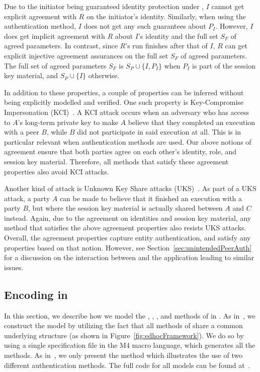 Due to the initiator being guaranteed identity protection under \mEdhoc{}, $I$
cannot get explicit agreement with $R$ on the initiator's identity.
%
Similarly, when using the \mStat{} authentication method, $I$ does not get 
any
such guarantees about $P_{I}$.
%
However, $I$ does get implicit agreement with $R$ about $I$'s identity and the
full set $S_{F}$ of agreed parameters.
%
In contrast, since $R$'s run finishes after that of $I$, $R$ can get explicit
injective agreement assurances on the full set $S_{F}$ of agreed parameters.
%
The full set of agreed parameters $S_F$ is $S_P \cup \{I, P_I\}$ when $P_I$
is part of the session key material, and $S_P \cup \{I\}$ otherwise.
%

In addition to these properties, a couple of properties can be inferred
without being explicitly modelled and verified.
%
One such property is Key-Compromise Impersonation
(KCI)~\cite{DBLP:conf/ima/Blake-WilsonJM97}.
%
A KCI attack occurs when an adversary who has access to $A$'s long-term 
private
key to make $A$ believe that they completed an execution with a peer $B$,
while $B$ did not participate in said execution at all.
%
This is in particular relevant when \mStat{} authentication methods are used.
%
Our above notions of agreement ensure that both parties agree on each
other's identity, role, and session key material.
%
Therefore, all \mEdhoc{} methods that satisfy these agreement properties also
avoid KCI attacks.
%

Another kind of attack is Unknown Key Share attacks
(UKS)~\cite{DBLP:conf/ima/Blake-WilsonJM97}.
%
As part of a UKS attack, a party $A$ can be made to believe that it finished
an execution with a party $B$, but where the session key material is actually
shared between $A$ and $C$ instead.
%
Again, due to the agreement on identities and session key material, any 
method
that satisfies the above agreement properties also resists UKS attacks.
%
Overall, the agreement properties capture entity authentication,
and satisfy any properties based on that notion.
%
However, see Section~\ref{sec:unintendedPeerAuth} for a discussion on the
interaction between \mEdhoc{} and the application leading to similar issues.
%

\subsection{Encoding \mEdhoc{} in \mTamarin}
\label{sec:modeling}
%
In this section, we describe how we model the \mSigSig, \mSigStat, \mStatSig,
and \mStatStat{} methods of \mEdhoc{} in \mTamarin.
%
As in~\cite{Norr21}, we construct the \mTamarin{} model by utilizing the fact
that all methods of \mEdhoc{} share a common underlying structure
(as shown in Figure~\ref{fig:edhocFramework}).
%
We do so by using a single specification file in the M4 macro language,
which generates all the methods.
%
As in~\cite{Norr21}, we only present the \mStatSig{} method which illustrates
the use of two different authentication methods.
%
The full \mTamarin{} code for all models can be found 
at~\cite{edhocTamarinRepo}.
%


